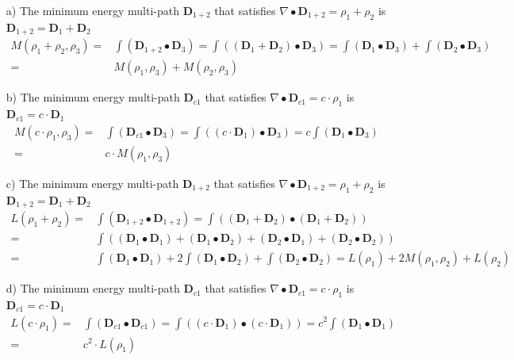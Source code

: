 \begin{itemize}
\item[a)]
The minimum energy multi-path \(\mathbf{D}_{1+2}\) that satisfies \(\nabla \bullet \mathbf{D}_{1+2} = \rho_1 + \rho_2\) is \(\mathbf{D}_{1+2} = \mathbf{D}_1 + \mathbf{D}_2\)
\begin{align*}
M(\rho_1 + \rho_2, \rho_3) = & \int (\mathbf{D}_{1+2} \bullet \mathbf{D}_3) = \int ((\mathbf{D}_1 + \mathbf{D}_2) \bullet \mathbf{D}_3) = \int (\mathbf{D}_1 \bullet \mathbf{D}_3) + \int (\mathbf{D}_2 \bullet \mathbf{D}_3) \\
= & M(\rho_1, \rho_3) + M(\rho_2, \rho_3)
\end{align*} 
\item[b)]
The minimum energy multi-path \(\mathbf{D}_{c1}\) that satisfies \(\nabla \bullet \mathbf{D}_{c1} = c \cdot \rho_1\) is \(\mathbf{D}_{c1} = c \cdot \mathbf{D}_1\)
\begin{align*}
M(c \cdot \rho_1, \rho_3) = & \int (\mathbf{D}_{c1} \bullet \mathbf{D}_3) = \int ((c \cdot \mathbf{D}_1) \bullet \mathbf{D}_3) = c\int (\mathbf{D}_1 \bullet \mathbf{D}_3) \\
= & c \cdot M(\rho_1, \rho_3)
\end{align*} 
\item[c)]
The minimum energy multi-path \(\mathbf{D}_{1+2}\) that satisfies \(\nabla \bullet \mathbf{D}_{1+2} = \rho_1 + \rho_2\) is \(\mathbf{D}_{1+2} = \mathbf{D}_1 + \mathbf{D}_2\)
\begin{align*}
L(\rho_1 + \rho_2) = & \int (\mathbf{D}_{1+2} \bullet \mathbf{D}_{1+2}) = \int ((\mathbf{D}_1 + \mathbf{D}_2) \bullet (\mathbf{D}_1 + \mathbf{D}_2)) \\
= & \int ((\mathbf{D}_1 \bullet \mathbf{D}_1) + (\mathbf{D}_1 \bullet \mathbf{D}_2) + (\mathbf{D}_2 \bullet \mathbf{D}_1) + (\mathbf{D}_2 \bullet \mathbf{D}_2)) \\
= & \int (\mathbf{D}_1 \bullet \mathbf{D}_1) + 2 \int (\mathbf{D}_1 \bullet \mathbf{D}_2) + \int (\mathbf{D}_2 \bullet \mathbf{D}_2) 
= L(\rho_1) + 2M(\rho_1, \rho_2) + L(\rho_2)
\end{align*}
\item[d)]
The minimum energy multi-path \(\mathbf{D}_{c1}\) that satisfies \(\nabla \bullet \mathbf{D}_{c1} = c \cdot \rho_1\) is \(\mathbf{D}_{c1} = c \cdot \mathbf{D}_1\)
\begin{align*}
L(c \cdot \rho_1) = & \int (\mathbf{D}_{c1} \bullet \mathbf{D}_{c1}) = \int ((c \cdot \mathbf{D}_1) \bullet (c \cdot \mathbf{D}_1)) = c^2\int (\mathbf{D}_1 \bullet \mathbf{D}_1) \\
= & c^2 \cdot L(\rho_1)
\end{align*} 
\end{itemize}   



